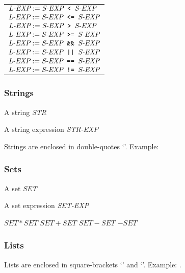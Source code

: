 \begin{tabular}{|l|} \hline
$\textit{L-EXP} := \textit{S-EXP} \verb+ < + \textit{S-EXP}$  \\
$\textit{L-EXP} := \textit{S-EXP} \verb+ <= + \textit{S-EXP}$  \\
$\textit{L-EXP} := \textit{S-EXP} \verb+ > + \textit{S-EXP}$  \\
$\textit{L-EXP} := \textit{S-EXP} \verb+ >= + \textit{S-EXP}$  \\
$\textit{L-EXP} := \textit{S-EXP} \verb+ && + \textit{S-EXP}$  \\
$\textit{L-EXP} := \textit{S-EXP} \verb+ || + \textit{S-EXP}$  \\
$\textit{L-EXP} := \textit{S-EXP} \verb+ == + \textit{S-EXP}$  \\
$\textit{L-EXP} := \textit{S-EXP} \verb+ != + \textit{S-EXP}$  \\ \hline
\end{tabular}



\subsubsection{Strings}

A string \textit{STR}

A string expression \textit{STR-EXP}


Strings are enclosed in double-quotes `'.  Example: 

\subsubsection{Sets}

A set \textit{SET}

A set expression \textit{SET-EXP}

$SET * SET$
$SET + SET$
$SET - SET$
$-SET$


\subsubsection{Lists} 

Lists are enclosed in square-brackets `\code{$[$}' and `\code{$]$}'.  Example: \code{$[$3e9,3e9,3e9$]$}.

